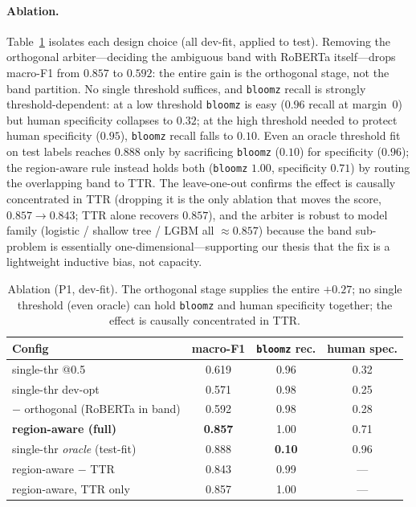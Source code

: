 \documentclass[11pt]{article}
\begin{document}
\paragraph{Ablation.} Table~\ref{tab:ablation} isolates each design choice
(all dev-fit, applied to test). Removing the orthogonal arbiter---deciding the
ambiguous band with RoBERTa itself---drops macro-F1 from $0.857$ to $0.592$:
the entire gain is the orthogonal stage, not the band partition. No single
threshold suffices, and \texttt{bloomz} recall is strongly threshold-dependent:
at a low threshold \texttt{bloomz} is easy ($0.96$ recall at margin~$0$) but
human specificity collapses to $0.32$; at the high threshold needed to protect
human specificity ($0.95$), \texttt{bloomz} recall falls to $0.10$. Even an
oracle threshold fit on test labels reaches $0.888$ only by sacrificing
\texttt{bloomz} ($0.10$) for specificity ($0.96$); the region-aware rule instead
holds both (\texttt{bloomz} $1.00$, specificity $0.71$) by routing the
overlapping band to TTR. The leave-one-out confirms the effect is causally
concentrated in TTR (dropping it is the only ablation that moves the score,
$0.857\!\rightarrow\!0.843$; TTR alone recovers $0.857$), and the arbiter is
robust to model family (logistic / shallow tree / LGBM all $\approx0.857$)
because the band sub-problem is essentially one-dimensional---supporting our
thesis that the fix is a lightweight inductive bias, not capacity.

\begin{table}[t]\centering\small
\begin{tabular}{lccc}
\toprule
Config & macro-F1 & \texttt{bloomz} rec. & human spec. \\
\midrule
single-thr @0.5 & 0.619 & 0.96 & 0.32 \\
single-thr dev-opt & 0.571 & 0.98 & 0.25 \\
$-$ orthogonal (RoBERTa in band) & 0.592 & 0.98 & 0.28 \\
\textbf{region-aware (full)} & \textbf{0.857} & 1.00 & 0.71 \\
\midrule
single-thr \emph{oracle} (test-fit) & 0.888 & \textbf{0.10} & 0.96 \\
\midrule
\quad region-aware $-$ TTR & 0.843 & 0.99 & --- \\
\quad region-aware, TTR only & 0.857 & 1.00 & --- \\
\bottomrule
\end{tabular}
\caption{Ablation (P1, dev-fit). The orthogonal stage supplies the entire
$+0.27$; no single threshold (even oracle) can hold \texttt{bloomz} and human
specificity together; the effect is causally concentrated in TTR.}
\label{tab:ablation}
\end{table}
\end{document}
